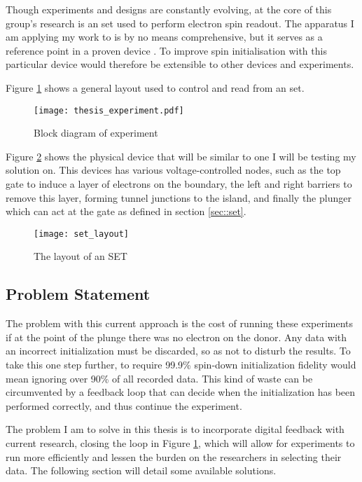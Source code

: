 \label{sec::experiment}
Though experiments and designs are constantly evolving, at the core of this group's research is an \gls{set} used to perform electron spin readout. The apparatus I am applying my work to is by no means comprehensive, but it serves as a reference point in a proven device \cite{morello2010single}. To improve spin initialisation with this particular device would therefore be extensible to other devices and experiments.

Figure \ref{fig::thesis_experiment} shows a general layout used to control and read from an \gls{set}.

\begin{figure}[htbp!]
	\centering
	\texttt{[image: thesis\_experiment.pdf]}
	\caption{Block diagram of experiment}
	\label{fig::thesis_experiment}
\end{figure}


Figure \ref{fig::set_layout} shows the physical device that will be similar to one I will be testing my solution on. This devices has various voltage-controlled nodes, such as the top gate to induce a layer of electrons on the boundary, the left and right barriers to remove this layer, forming tunnel junctions to the island, and finally the plunger which can act at the gate as defined in section \ref{sec::set}.

\begin{figure}[htbp!]
	\centering
	\texttt{[image: set\_layout]}
	\caption{The layout of an SET}
	\label{fig::set_layout}
\end{figure}

\subsection{Problem Statement}
The problem with this current approach is the cost of running these experiments if at the point of the plunge there was no electron on the donor. Any data with an incorrect initialization must be discarded, so as not to disturb the results. To take this one step further, to require 99.9\% spin-down initialization fidelity would mean ignoring over 90\% of all recorded data. This kind of waste can be circumvented by a feedback loop that can decide when the initialization has been performed correctly, and thus continue the experiment.

The problem I am to solve in this thesis is to incorporate digital feedback with current research, closing the loop in Figure \ref{fig::thesis_experiment}, which will allow for experiments to run more efficiently and lessen the burden on the researchers in selecting their data. The following section will detail some available solutions.

